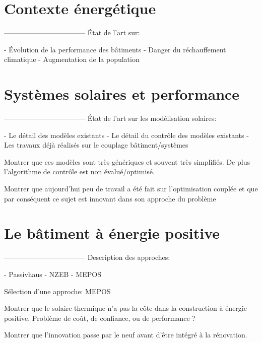 

\section{Contexte énergétique} %
\label{sec:contexte_energetique}
-----------------------------------
État de l’art sur:

 - Évolution de la performance des bâtiments
 - Danger du réchauffement climatique
 - Augmentation de la population


\section{Systèmes solaires et performance} %
\label{sec:systemes_solaires_et_performance}
-----------------------------------
État de l’art sur les modélisation solaires:

 - Le détail des modèles existants
 - Le détail du contrôle des modèles existants
 - Les travaux déjà réalisés sur le couplage bâtiment/systèmes


Montrer que ces modèles sont très génériques et souvent très simplifiés.
De plus l’algorithme de contrôle est non évalué/optimisé.

Montrer que aujourd’hui peu de travail a été fait sur l’optimisation couplée
et que par conséquent ce sujet est innovant dans son approche du problème


\section{Le bâtiment à énergie positive} %
\label{sec:le_batiment_a_energie_positive}
-----------------------------------
Description des approches:

 - Passivhaus
 - NZEB
 - MEPOS

Sélection d’une approche: MEPOS

Montrer que le solaire thermique n’a pas la côte dans la construction à énergie positive.
Problème de coût, de confiance, ou de performance ?

Montrer que l’innovation passe par le neuf avant d’être intégré à la rénovation.
